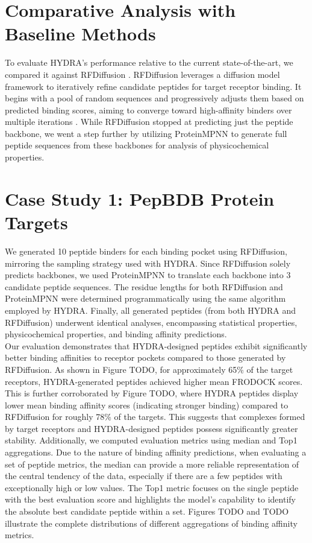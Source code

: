 \section{Comparative Analysis with Baseline Methods}
To evaluate HYDRA's performance relative to the current state-of-the-art, we compared it against RFDiffusion \cite{watson2023novo}. RFDiffusion leverages a diffusion model framework to iteratively refine candidate peptides for target receptor binding. It begins with a pool of random sequences and progressively adjusts them based on predicted binding scores, aiming to converge toward high-affinity binders over multiple iterations \cite{watson2023novo}. While RFDiffusion stopped at predicting just the peptide backbone, we went a step further by utilizing ProteinMPNN \cite{dauparas2022robust} to generate full peptide sequences from these backbones for analysis of physicochemical properties. \\

\section{Case Study 1: PepBDB Protein Targets}
We generated 10 peptide binders for each binding pocket using RFDiffusion, mirroring the sampling strategy used with HYDRA. Since RFDiffusion solely predicts backbones, we used ProteinMPNN to translate each backbone into 3 candidate peptide sequences. The residue lengths for both RFDiffusion and ProteinMPNN were determined programmatically using the same algorithm employed by HYDRA. Finally, all generated peptides (from both HYDRA and RFDiffusion) underwent identical analyses, encompassing statistical properties, physicochemical properties, and binding affinity predictions. \\

Our evaluation demonstrates that HYDRA-designed peptides exhibit significantly better binding affinities to receptor pockets compared to those generated by RFDiffusion. As shown in Figure TODO, for approximately 65\% of the target receptors, HYDRA-generated peptides achieved higher mean FRODOCK scores. This is further corroborated by Figure TODO, where HYDRA peptides display lower mean binding affinity scores (indicating stronger binding) compared to RFDiffusion for roughly 78\% of the targets. This suggests that complexes formed by target receptors and HYDRA-designed peptides possess significantly greater stability. 
Additionally, we computed evaluation metrics using median and Top1 aggregations. Due to the nature of binding affinity predictions, when evaluating a set of peptide metrics, the median can provide a more reliable representation of the central tendency of the data, especially if there are a few peptides with exceptionally high or low values. The Top1 metric focuses on the single peptide with the best evaluation score and highlights the model's capability to identify the absolute best candidate peptide within a set. Figures TODO and TODO illustrate the complete distributions of different aggregations of binding affinity metrics. \\

